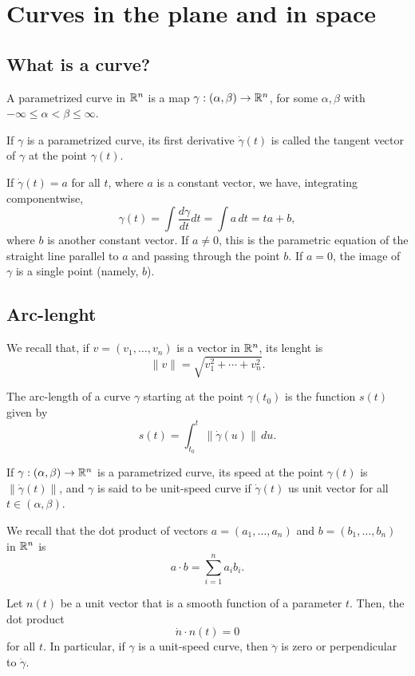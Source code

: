 \section{Curves in the plane and in space}

\subsection{What is a curve?}

\begin{defn}
  A parametrized curve in $\mathbb{R}^n$
  is a map $\gamma: (\alpha, \beta) \to \mathbb{R}^n$,
  for some $\alpha, \beta$ with $-\infty \leq \alpha < \beta \leq \infty$.
\end{defn}

\begin{defn}
  If $\gamma$ is a parametrized curve, its first derivative $\dot{\gamma}(t)$
  is called the tangent vector of $\gamma$ at the point $\gamma(t)$.
\end{defn}

\begin{proposition}
  If $\dot{\gamma}(t) = a$ for all $t$, where $a$ is a constant vector,
  we have, integrating componentwise,
  \[
    \gamma(t) = \int \frac{d\gamma}{dt} dt = \int a \, dt = ta + b,
  \]
  where $b$ is another constant vector.
  If $a \neq 0$, this is the parametric equation of the straight
  line parallel to $a$ and passing through the point $b$.
  If $a = 0$, the image of $\gamma$ is a single point (namely, $b$).
\end{proposition}

\subsection{Arc-lenght}

We recall that, if $v = (v_1, \dots, v_n)$ is a vector in $\mathbb{R}^n$, its lenght is
\[
    \|v\| = \sqrt{v_1^2 + \cdots + v_n^2}.
\]

\begin{defn}
  The arc-length of a curve $\gamma$ starting at the point $\gamma(t_0)$
  is the function $s(t)$ given by
  \[
    s(t) = \int_{t_0}^t \|\dot{\gamma}(u)\| \, du.
  \]
\end{defn}

\begin{defn}
  If $\gamma: (\alpha, \beta) \to \mathbb{R}^n$ is a parametrized curve,
  its speed at the point $\gamma(t)$ is $\|\dot{\gamma}(t)\|$,
  and $\gamma$ is said to be unit-speed curve if $\dot{\gamma}(t)$
  us unit vector for all $t \in (\alpha, \beta)$.
\end{defn}

We recall that the dot product of vectors
$a = (a_1, \dots, a_n)$ and
$b = (b_1, \dots, b_n)$ in $\mathbb{R}^n$ is
\[
  a \cdot b = \sum_{i = 1}^n a_i b_i.
\]

\begin{proposition}
  Let $n(t)$ be a unit vector that is a smooth function of a parameter $t$.
  Then, the dot product
  \[
    \dot{n} \cdot n(t) = 0  
  \]
  for all $t$. In particular, if $\gamma$ is a unit-speed curve,
  then $\ddot{\gamma}$ is zero or perpendicular to $\dot{\gamma}$.
\end{proposition}